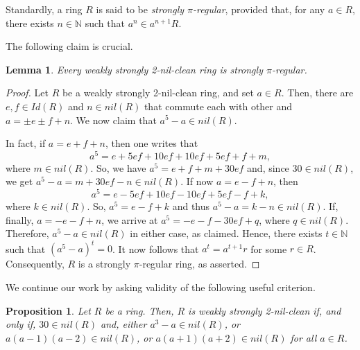 \documentclass[12pt]{amsart}
\newtheorem{proposition}[theorem]{Proposition}
\newtheorem{lemma}[theorem]{Lemma}
\theoremstyle{definition}
\begin{document}
Standardly, a ring $R$ is said to be {\it strongly $\pi$-regular}, provided that, for any $a \in R$, there exists $n \in \mathbb{N}$ such that $a^n \in a^{n+1}R$.

\medskip

The following claim is crucial.

\begin{lemma}\label{2.12}
Every weakly strongly 2-nil-clean ring is strongly $\pi$-regular.
\end{lemma}

\begin{proof} Let $R$ be a weakly strongly 2-nil-clean ring, and set $a \in R$. Then, there are $e,f\in Id(R)$ and $n\in nil(R)$ that commute each with other and $a=\pm e\pm f+n$. We now claim that $a^5-a\in nil(R)$.

In fact, if $a=e+f+n$, then one writes that $$a^5=e+5ef+10ef+10ef+5ef+f+m,$$ where $m\in nil(R)$. So, we have $a^5=e+f+m+30ef$ and, since $30\in nil(R)$, we get $a^5-a=m+30ef-n\in nil(R)$. If now $a=e-f+n$, then $$a^5=e-5ef+10ef-10ef+5ef-f+k,$$ where $k\in nil(R)$. So, $a^5=e-f+k$ and thus $a^5-a=k-n\in nil(R)$. If, finally, $a=-e-f+n$, we arrive at $a^5=-e-f-30ef+q$, where $q\in nil(R)$. Therefore, $a^5-a\in nil(R)$ in either case, as claimed. Hence, there exists $t \in \mathbb{N}$ such that $(a^5-a)^t = 0$. It now follows that $a^{t} = a^{t+1}r$ for some $r \in R$. Consequently, $R$ is a strongly $\pi$-regular ring, as asserted.
\end{proof}	

We continue our work by asking validity of the following useful criterion.

\begin{proposition}\label{three} Let $R$ be a ring. Then, $R$ is weakly strongly 2-nil-clean if, and only if, $30\in nil(R)$ and, either $a^3-a\in nil(R)$, or $a(a-1)(a-2)\in nil(R)$, or $a(a+1)(a+2)\in nil(R)$ for all $a\in R$.
\end{proposition}
\end{document}

